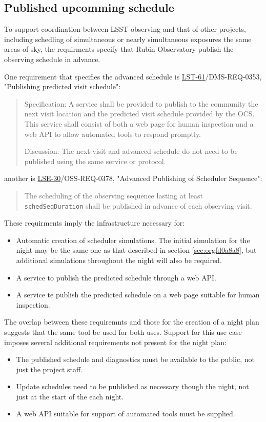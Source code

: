 \subsection{Published upcomming schedule}
\label{sec:orga05b3b7}
To support coordination between LSST observing and that of other projects, including schedling of simultaneous or nearly simultaneous exposures the same areas of sky, the requirments specify that Rubin Observatory publish the observing schedule in advance.

One requirement that specifies the advanced schedule is \href{https://ls.st/lse-61}{LST-61}/DMS-REQ-0353, "Publishing predicted visit schedule":
\begin{quote}
Specification: A service shall be provided to publish to the community the next visit location and the predicted visit schedule provided by the OCS. This service shall consist of both a web page for human inspection and a web API to allow automated tools to respond promptly.

Discussion: The next visit and advanced schedule do not need to be published using the same service or protocol.
\end{quote}
another is \href{https://ls.st/lse-30}{LSE-30}/OSS-REQ-0378, "Advanced Publishing of Scheduler Sequence":
\begin{quote}
The scheduling of the observing sequence lasting at least \texttt{schedSeqDuration} shall be published in advance of each observing visit.
\end{quote}

These requirments imply the infrastructure necessary for:
\begin{itemize}
\item Automatic creation of scheduler simulations. The initial simulation for the night may be the same one as that described in section \ref{sec:orgfd0a8a8}, but additional simulations throughout the night will also be required.
\item A service to publish the predicted schedule through a web API.
\item A service te publish the predicted schedule on a web page suitable for human inspection.
\end{itemize}

The overlap between these requiremnts and those for the creation of a night plan suggests that the same tool be used for both uses. 
Support for this use case imposes several additional requirements not present for the night plan:
\begin{itemize}
\item The published schedule and diagnostics must be available to the public, not just the project staff.
\item Update schedules need to be published as necessary though the night, not just at the start of the each night.
\item A web API suitable for support of automated tools must be supplied.
\end{itemize}

